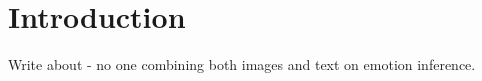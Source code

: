 \chapter{Introduction}

Write about - no one combining both images and text on emotion inference.
















